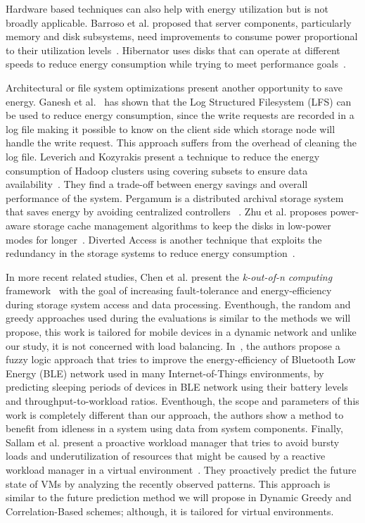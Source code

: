 Hardware based techniques can also help with energy utilization but is
not broadly applicable.
Barroso et al. proposed that server components, particularly memory and disk
subsystems, need improvements to consume power proportional to their utilization levels~\cite{33387}.
Hibernator uses disks that can operate at different speeds to reduce energy consumption while trying to
meet performance goals~\cite{Zhu:2005:HHD:1095810.1095828}.

Architectural or file system optimizations present another opportunity
to save energy.
Ganesh et al.~\cite{GaneshWeatherspoonBalakrishnanBirman07_OptimizingPowerConsumptionInLargeScaleStorageSystems}
has shown that the Log Structured Filesystem (LFS) can be used to reduce energy consumption, since
the write requests are recorded in a log file making it possible to know on the client side which
storage node will handle the write request. This approach suffers from the overhead of cleaning
the log file.
Leverich and Kozyrakis present a technique to reduce the energy consumption of Hadoop clusters using
covering subsets to ensure data availability~\cite{Leverich:2010:EEH:1740390.1740405}. They find a trade-off
between energy savings and overall performance of the system.
Pergamum is a distributed archival storage system that saves energy by avoiding centralized controllers
~\cite{Storer:2008:PRT:1364813.1364814}.
Zhu et al. proposes power-aware storage cache management algorithms to keep the disks in low-power modes
for longer~\cite{Zhu:2004:REC:1072448.1072462}.
Diverted Access is another technique that exploits the redundancy in the storage systems to reduce
energy consumption~\cite{Pinheiro:2006:ERC:1140277.1140281}.

In more recent related studies, Chen et al. present the \textit{k-out-of-n computing} framework~\cite{6847230}
with the goal of increasing fault-tolerance and energy-efficiency during storage system access and data
processing. Eventhough, the random and greedy approaches used during the evaluations is similar
to the methods we will propose, this work is tailored for mobile devices in a dynamic network and unlike our
study, it is not concerned with load balancing. In~\cite{Collotta2015137}, the authors propose a fuzzy logic
approach that tries to improve the energy-efficiency of Bluetooth Low Energy (BLE) network used in many
Internet-of-Things environments, by predicting sleeping periods of devices in BLE network using their battery
levels and throughput-to-workload ratios. Eventhough, the scope and parameters of this work is completely
different than our approach, the authors show a method to benefit from idleness in a system using data from
system components. Finally, Sallam et al. present a proactive workload manager that tries to avoid bursty loads and
underutilization of resources that might be caused by a reactive workload manager in a virtual environment~\cite{Sallam:2014:PWM:2658292.2658555}.
They proactively predict the future state of VMs by analyzing the recently observed patterns. This approach
is similar to the future prediction method we will propose in Dynamic Greedy and Correlation-Based schemes; although,
it is tailored for virtual environments.

